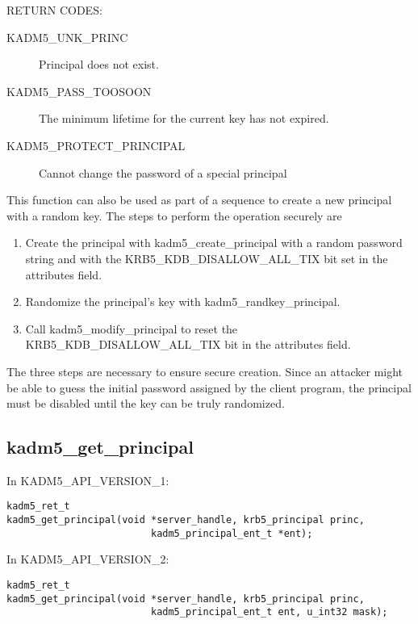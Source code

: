 RETURN CODES:

\begin{description}
\item[KADM5_UNK_PRINC] Principal does not exist.
\item[KADM5_PASS_TOOSOON] The minimum lifetime for the current
key has not expired.
\item[KADM5_PROTECT_PRINCIPAL] Cannot change the password of a special
principal
\end{description}

This function can also be used as part of a sequence to create a new
principal with a random key.  The steps to perform the operation
securely are

\begin{enumerate}
\item Create the principal with kadm5_create_principal with a
random password string and with the KRB5_KDB_DISALLOW_ALL_TIX bit set
in the attributes field.

\item Randomize the principal's key with kadm5_randkey_principal.

\item Call kadm5_modify_principal to reset the
KRB5_KDB_DISALLOW_ALL_TIX bit in the attributes field.
\end{enumerate}

The three steps are necessary to ensure secure creation.  Since an
attacker might be able to guess the initial password assigned by the
client program, the principal must be disabled until the key can be
truly randomized.

\subsection{kadm5_get_principal}

In KADM5_API_VERSION_1:

\begin{verbatim}
kadm5_ret_t
kadm5_get_principal(void *server_handle, krb5_principal princ, 
                         kadm5_principal_ent_t *ent);  
\end{verbatim}

In KADM5_API_VERSION_2:

\begin{verbatim}
kadm5_ret_t
kadm5_get_principal(void *server_handle, krb5_principal princ, 
                         kadm5_principal_ent_t ent, u_int32 mask);  
\end{verbatim}

